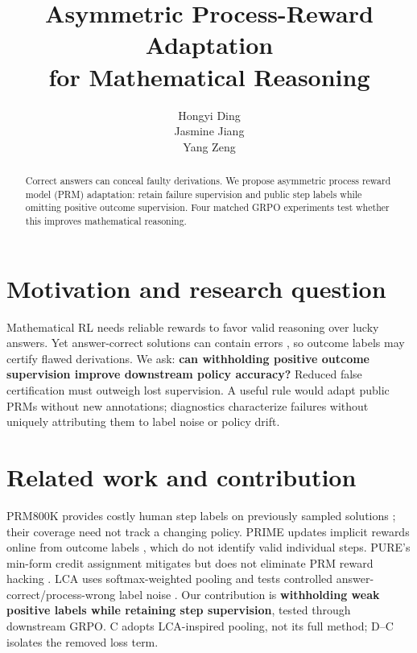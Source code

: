 \documentclass{article}
\title{Asymmetric Process-Reward Adaptation\\for Mathematical Reasoning}
\author{
Hongyi Ding \\
\And
Jasmine Jiang \\
\And
Yang Zeng \\
}
\begin{document}
\maketitle
\begin{abstract}
Correct answers can conceal faulty derivations. We propose asymmetric process reward model (PRM) adaptation: retain failure supervision and public step labels while omitting positive outcome supervision. Four matched GRPO experiments test whether this improves mathematical reasoning.
\end{abstract}

\section{Motivation and research question}
Mathematical RL needs reliable rewards to favor valid reasoning over lucky answers. Yet answer-correct solutions can contain errors \citep{zheng2025}, so outcome labels may certify flawed derivations. We ask: \textbf{can withholding positive outcome supervision improve downstream policy accuracy?} Reduced false certification must outweigh lost supervision. A useful rule would adapt public PRMs without new annotations; diagnostics characterize failures without uniquely attributing them to label noise or policy drift.

\section{Related work and contribution}
PRM800K provides costly human step labels on previously sampled solutions \citep{lightman2023}; their coverage need not track a changing policy. PRIME updates implicit rewards online from outcome labels \citep{cui2025}, which do not identify valid individual steps. PURE's min-form credit assignment mitigates but does not eliminate PRM reward hacking \citep{cheng2025}. LCA uses softmax-weighted pooling and tests controlled answer-correct/process-wrong label noise \citep[App.~E.3]{jia2026}. Our contribution is \textbf{withholding weak positive labels while retaining step supervision}, tested through downstream GRPO. C adopts LCA-inspired pooling, not its full method; D--C isolates the removed loss term.
\end{document}
